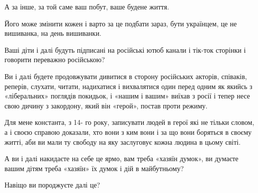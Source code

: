 А за інше, за той саме ваш побут, ваше будене життя.

Його може змінити кожен і варто за це подбати зараз, бути українцем, це не
вишиванка, на день вишиванки. 

Ваші діти і далі будуть підписані на російські ютюб канали і тік-ток сторінки і
говорити переважно російською?

Ви і далі будете продовжувати дивитися в сторону російських акторів, співаків,
реперів, слухати, читати, надихатися і вихвалятися один перед одним як якийсь з
«ліберальних» поглядів покидьок, і «нашим і вашим» виїхав з росії і тепер несе
свою дичину з закордону, який він «герой», постав проти режиму.

Для мене константа, з 14- го року, записувати людей в герої які не тільки
словом, а і своєю справою доказали, хто вони з ким вони і за що вони боряться в
своєму житті, аби ви мали ту свободу на яку заслуговує кожна людина в цьому
світі.

А ви і далі накидаєте на себе це ярмо, вам треба «хазяїн думок», ви думаєте
вашим дітям треба «хазяїн» їх думок і дій в майбутньому?

Навіщо ви породжуєте далі це? 

